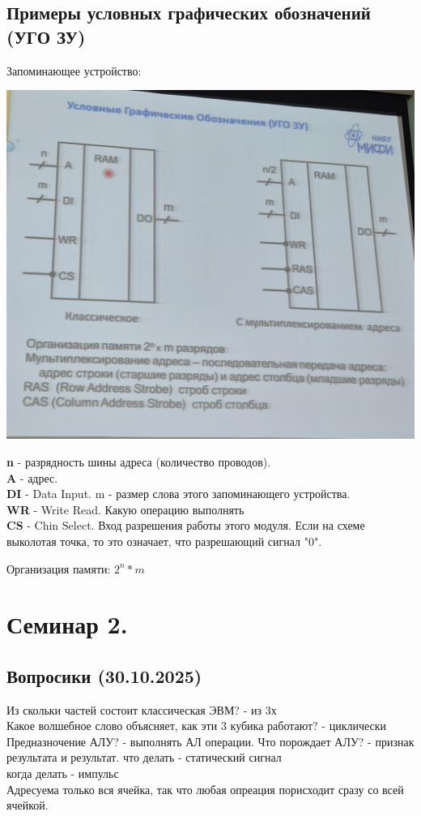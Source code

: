 \documentclass[12px]{article}
\begin{document}
\subsection{Примеры условных графических обозначений (УГО ЗУ)}
Запоминающее устройство:
\begin{center}	
	\includegraphics[width=0.7\linewidth]{images/УГО ЗУ.jpg}\\
\end{center}
\textbf{n} - разрядность шины адреса (количество проводов). \\
\textbf{A} - адрес.\\
\textbf{DI} - Data Input. m - размер слова этого запоминающего устройства.\\
\textbf{WR} - Write Read. Какую операцию выполнять\\
\textbf{CS} - Chin Select. Вход разрешения работы этого модуля. Если на схеме выколотая точка, то это означает, что разрешающий сигнал "0".

Организация памяти: $2^n * m$

\section{Семинар 2.}
\subsection{Вопросики (30.10.2025)}
Из скольки частей состоит классическая ЭВМ? - из 3х\\
Какое волшебное слово объясняет, как эти 3 кубика работают? - циклически\\
Предназночение АЛУ? - выполнять АЛ операции.
Что порождает АЛУ? - признак результата и результат. 
что делать - статический сигнал\\
когда делать - импульс\\
Адресуема только вся ячейка, так что любая опреация порисходит сразу со всей ячейкой.\\
\end{document}
